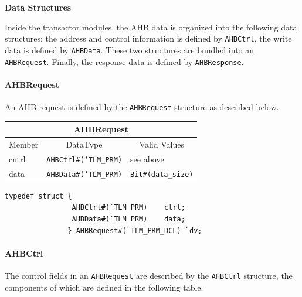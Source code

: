 \documentclass[twoside,letterpaper]{article}
\newcommand{\te}[1]{\texttt{#1}}
\begin{document}
{\bf Data Structures}

Inside the transactor modules, the AHB data is organized into the
following data structures: the address and control information is
defined by \te{AHBCtrl}, the write data is defined by \te{AHBData}.
These two structures are bundled into an \te{AHBRequest}. Finally, 
the response data is defined by \te{AHBResponse}.

\paragraph{\bf AHBRequest}
An AHB request is defined by the \te{AHBRequest} structure as
described below.

\begin{center}
\begin{tabular}{|p{1 in}|p{1.8in}|p{3.2 in}|}
\hline
\multicolumn{3}{|c|}{AHBRequest} \\
\hline
\multicolumn{1}{|c|}{Member}&\multicolumn{1}{|c|}{DataType}&\multicolumn{1}{|c|}{Valid Values} \\
\hline
\hline
cntrl&\te{AHBCtrl\#(`TLM\_PRM)}&see above\\
\hline
data&\te{AHBData\#(`TLM\_PRM)}&\te{Bit\#(data\_size)}\\
\hline
\end{tabular}
\end{center}


\begin{verbatim}
typedef struct {
                AHBCtrl#(`TLM_PRM)    ctrl;
                AHBData#(`TLM_PRM)    data;
               } AHBRequest#(`TLM_PRM_DCL) `dv;

\end{verbatim}

\paragraph{\bf AHBCtrl} The control fields in an \te{AHBRequest} are
                described by the \te{AHBCtrl} structure, the components
                of which are defined in the following table.
\end{document}
